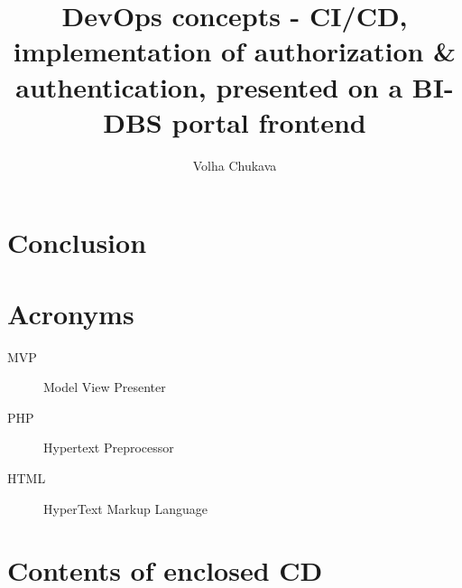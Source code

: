 \documentclass[thesis=B,english]{template/FITthesis}[2019/12/23]
\title{DevOps concepts - CI/CD, implementation of authorization \& authentication, presented on a BI-DBS portal frontend}
\author{Volha Chukava} %
\begin{document}





 
% 
% 
% 
% 
% 

\chapter{Conclusion}



\nocite{*}
\printbibliography[title={Bibliography}]



\chapter{Acronyms}
\begin{description}
   \item[MVP] Model View Presenter
   \item[PHP] Hypertext Preprocessor
   \item[HTML] HyperText Markup Language
\end{description}


\chapter{Contents of enclosed CD}




\end{document}
